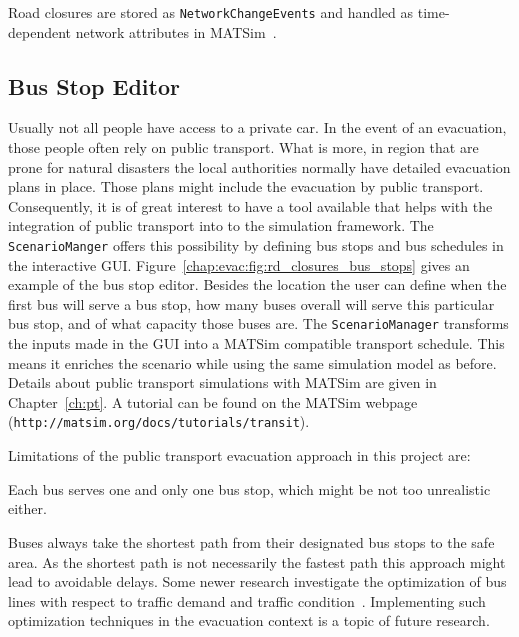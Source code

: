 Road closures are stored as \lstinline|NetworkChangeEvents| and handled as time-dependent network attributes in MATSim~\cite{LaemmelEtAl_TransResC_2010}.

\subsection{Bus Stop Editor}
Usually not all people have access to a private car. In the event of an evacuation, those people often rely on public transport. What is more, in region that are prone for natural disasters the local authorities normally have detailed evacuation plans in place. Those plans might include the evacuation by public transport. Consequently, it is of great interest to have a tool available that helps with the integration of public transport into to the simulation framework. The \lstinline|ScenarioManger| offers this possibility by defining bus stops and bus schedules in the interactive GUI. Figure~\ref{chap:evac:fig:rd_closures_bus_stops} gives an example of the bus stop editor. Besides the location the user can define when the first bus will serve a bus stop, how many buses overall will serve this particular bus stop, and of what capacity those buses are. 
The \lstinline|ScenarioManager| transforms the inputs made in the GUI into a MATSim compatible transport schedule. This means it enriches the scenario while using the same simulation model as before. Details about public transport simulations with MATSim are given in Chapter~\ref{ch:pt}. A tutorial can be found on the MATSim webpage (\lstinline|http://matsim.org/docs/tutorials/transit|).

Limitations of the public transport evacuation approach in this project are:
\begin{compactitem}
\item Each bus serves one and only one bus stop, which might be not too unrealistic either.
\item Buses always take the shortest path from their designated bus stops to the safe area. As the shortest path is not necessarily the fastest path this approach might lead to avoidable delays. Some newer research investigate the optimization of bus lines with respect to traffic demand and traffic condition~\citep{Neumann_PhDThesis_2014}. Implementing such optimization techniques in the evacuation context is a topic of future research.
\end{compactitem}

